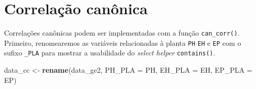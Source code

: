 \documentclass[
]{book}
\newenvironment{Shaded}{\begin{snugshade}}{\end{snugshade}}
\newcommand{\DataTypeTok}[1]{\textcolor[rgb]{0.13,0.29,0.53}{#1}}
\newcommand{\KeywordTok}[1]{\textcolor[rgb]{0.13,0.29,0.53}{\textbf{#1}}}
\newcommand{\NormalTok}[1]{#1}
\newcommand{\StringTok}[1]{\textcolor[rgb]{0.31,0.60,0.02}{#1}}
\begin{document}
\hypertarget{correlauxe7uxe3o-canuxf4nica}{%
\section{Correlação canônica}\label{correlauxe7uxe3o-canuxf4nica}}

Correlações canônicas podem ser implementadas com a função \texttt{can\_corr()}. Primeiro, renomearemos as variáveis relacionadas à planta \texttt{PH} \texttt{EH} e \texttt{EP} com o sufixo \texttt{\_PLA} para mostrar a usabilidade do \emph{select helper} \texttt{contains()}.

\begin{Shaded}
\begin{Highlighting}[]
\NormalTok{data_cc <-}\StringTok{ }
\StringTok{  }\KeywordTok{rename}\NormalTok{(data_ge2,}
         \DataTypeTok{PH_PLA =}\NormalTok{ PH,}
         \DataTypeTok{EH_PLA =}\NormalTok{ EH,}
         \DataTypeTok{EP_PLA =}\NormalTok{ EP)}


\end{Highlighting}
\end{Shaded}
\end{document}
